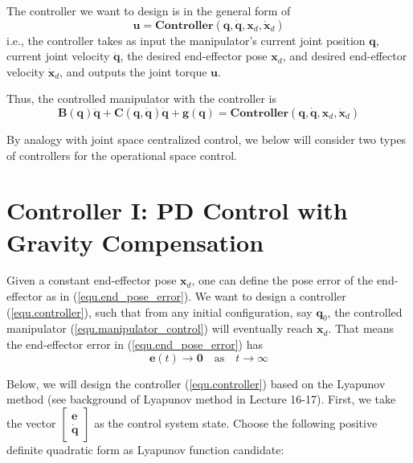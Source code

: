 \documentclass[10pt]{article}
\begin{document}
The controller we want to design is in the general form of 
\begin{equation}\label{equ.controller}
\boldsymbol{u}=\textbf{Controller}(\boldsymbol{q}, \boldsymbol{\dot{q}}, \boldsymbol{x}_d, \boldsymbol{\dot{x}}_d)
\end{equation}
i.e., the controller takes as input the manipulator's current joint position $\boldsymbol{q}$, current joint velocity $\boldsymbol{\dot{q}}$, the desired end-effector pose $\boldsymbol{x}_d$, and desired end-effector velocity $\boldsymbol{\dot{x}}_d$, and outputs the joint torque $\boldsymbol{u}$.

Thus, the controlled manipulator  with the controller  is 
\begin{equation}\label{equ.manipulator_control}
    \boldsymbol{B}(\boldsymbol{q}) \ddot{\boldsymbol{q}}+\boldsymbol{C}(\boldsymbol{q}, \dot{\boldsymbol{q}}) \dot{\boldsymbol{q}}+\boldsymbol{g}(\boldsymbol{q})=\textbf{Controller}(\boldsymbol{q}, \boldsymbol{\dot{q}}, \boldsymbol{x}_d, \boldsymbol{\dot{x}}_d)
\end{equation}



By analogy with joint space centralized control, we below will consider two types of  controllers for the operational space control.


\section{Controller I: PD Control with Gravity Compensation}
Given a constant end-effector pose $\boldsymbol{x}_{d}$, one can define the pose error of the end-effector as in (\ref{equ.end_pose_error}). We want to design a controller (\ref{equ.controller}), such that from  any initial configuration, say $\boldsymbol{q}_0$, the controlled manipulator (\ref{equ.manipulator_control}) will eventually reach $\boldsymbol{x}_{d}$. That means  the end-effector error in (\ref{equ.end_pose_error}) has
$$
\boldsymbol{e}(t)\rightarrow \boldsymbol{0}\quad \text{as}\quad
t\rightarrow \infty
$$

Below, we will design the controller (\ref{equ.controller}) based on the Lyapunov method (see  background of Lyapunov method in Lecture 16-17). First, we take the vector $\begin{bmatrix}\boldsymbol{e}\\
\boldsymbol{\dot{q}}\end{bmatrix}$  as the control system state. Choose the following positive definite quadratic form as Lyapunov function candidate:
\end{document}
